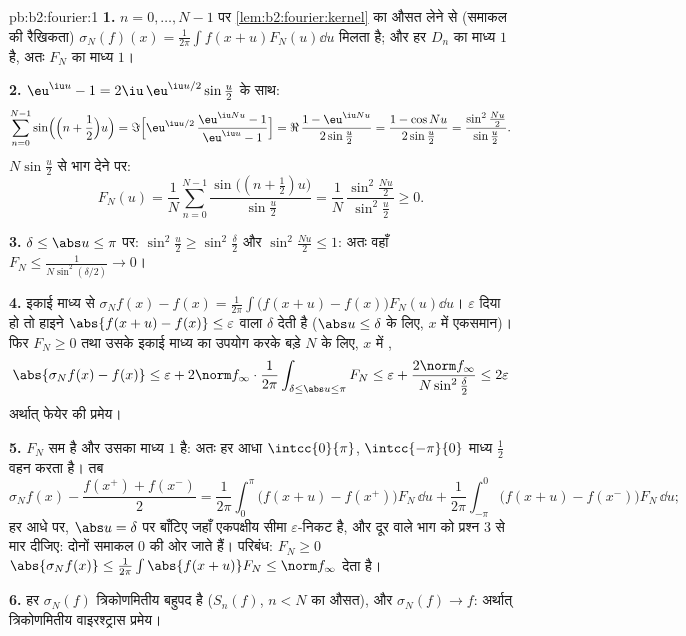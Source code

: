 \begin{solution}{pb:b2:fourier:1}
\textbf{1.} $n = 0,
\dots, N-1$ पर \cref{lem:b2:fourier:kernel} का औसत लेने से (समाकल की रैखिकता) $\sigma_N(f)(x) =
\frac{1}{2\pi}\int f(x+u)F_N(u)\dd u$ मिलता है; और
हर $D_n$ का माध्य $1$ है, अतः $F_N$ का माध्य $1$।

\textbf{2.} $\eu^{\iu u} - 1 = 2\iu\,\eu^{\iu
u/2}\sin\frac u2$ के साथ:
\[
\sum_{n=0}^{N-1}\sin\Bigl(\Bigl(n + \frac12\Bigr)u\Bigr)
= \Im\Bigl[\eu^{\iu u/2}\,\frac{\eu^{\iu Nu} - 1}{\eu^{\iu u}
- 1}\Bigr]
= \Re\,\frac{1 - \eu^{\iu Nu}}{2\sin\frac u2}
= \frac{1 - \cos Nu}{2\sin\frac u2}
= \frac{\sin^2\frac{Nu}2}{\sin\frac u2} .
\]
$N\sin\frac u2$ से भाग देने पर:
\[
F_N(u) = \frac1N\sum_{n=0}^{N-1}
\frac{\sin\bigl((n+\frac12)u\bigr)}{\sin\frac u2}
= \frac{1}{N}\,
\frac{\sin^2\frac{Nu}{2}}{\sin^2\frac u2} \geq 0 .
\]

\textbf{3.} $\delta \leq \abs u \leq \pi$ पर: $\sin^2\frac u2
\geq \sin^2\frac\delta2$ और $\sin^2\frac{Nu}2 \leq 1$: अतः वहाँ  $F_N
\leq \frac{1}{N\sin^2(\delta/2)} \to 0$।

\textbf{4.} इकाई माध्य से $\sigma_Nf(x) - f(x) =
\frac{1}{2\pi}\int\bigl(f(x+u) - f(x)\bigr)F_N(u)\dd u$। $\varepsilon$ दिया हो तो हाइने $\abs{f(x+u) - f(x)}
\leq \varepsilon$ वाला $\delta$ देती है
($\abs u \leq \delta$ के लिए, $x$ में एकसमान)। फिर $F_N \geq 0$ तथा उसके इकाई माध्य का उपयोग करके
बड़े $N$ के लिए, $x$ में ,
\[
\abs{\sigma_Nf(x) - f(x)}
\leq \varepsilon +
2\norm f_\infty\cdot\frac{1}{2\pi}
\int_{\delta\leq\abs u\leq\pi}F_N
\leq \varepsilon + \frac{2\norm
f_\infty}{N\sin^2\frac\delta2}
\leq 2\varepsilon
\]
अर्थात् फेयेर की प्रमेय।

\textbf{5.} $F_N$ सम है और उसका माध्य $1$ है: अतः हर आधा $\intcc{0}{\pi}$, $\intcc{-\pi}{0}$ माध्य $\frac12$
वहन करता है। तब
\[
\sigma_Nf(x) - \frac{f(x^+)+f(x^-)}{2}
= \frac{1}{2\pi}\int_0^\pi\bigl(f(x+u) -
f(x^+)\bigr)F_N\,\dd u
+ \frac{1}{2\pi}\int_{-\pi}^0\bigl(f(x+u) -
f(x^-)\bigr)F_N\,\dd u ;
\]
हर आधे पर, $\abs u = \delta$ पर बाँटिए जहाँ एकपक्षीय सीमा $\varepsilon$-निकट है, और दूर वाले भाग
को प्रश्न 3 से मार दीजिए: दोनों समाकल $0$ की ओर जाते हैं। परिबंध: $F_N \geq 0$ $\abs{\sigma_Nf(x)} \leq
\frac{1}{2\pi}\int\abs{f(x+u)}F_N \leq \norm f_\infty$
देता है।

\textbf{6.} हर $\sigma_N(f)$ त्रिकोणमितीय बहुपद है ($S_n(f)$, $n < N$ का औसत), और  $\sigma_N(f) \to f$: अर्थात् त्रिकोणमितीय वाइरश्ट्रास प्रमेय।


\end{solution}
